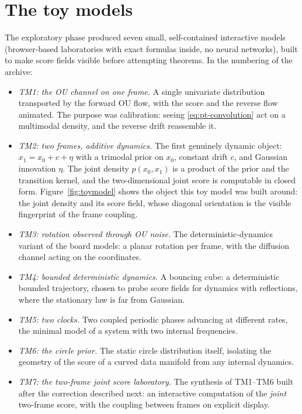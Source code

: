 \section{The toy models}\label{sec:dev-toys}

The exploratory phase produced seven small, self-contained interactive
models (browser-based laboratories with exact formulas inside, no neural
networks), built to make score fields visible before attempting theorems.
In the numbering of the archive:

\begin{itemize}
  \item \emph{TM1: the OU channel on one frame.} A single univariate
  distribution transported by the forward OU flow, with the score and the
  reverse flow animated. The purpose was calibration: seeing
  \eqref{eq:pt-convolution} act on a multimodal density, and the reverse
  drift reassemble it.
  \item \emph{TM2: two frames, additive dynamics.} The first genuinely
  dynamic object: $x_1 = x_0 + c + \eta$ with a trimodal prior on $x_0$,
  constant drift $c$, and Gaussian innovation $\eta$. The joint density
  $p(x_0, x_1)$ is a product of the prior and the transition kernel, and
  the two-dimensional joint score is computable in closed form.
  Figure~\ref{fig:toymodel} shows the object this toy model was built
  around: the joint density and its score field, whose diagonal
  orientation is the visible fingerprint of the frame coupling.
  \item \emph{TM3: rotation observed through OU noise.} The
  deterministic-dynamics variant of the board models: a planar rotation
  per frame, with the diffusion channel acting on the coordinates.
  \item \emph{TM4: bounded deterministic dynamics.} A bouncing cube:
  a deterministic bounded trajectory, chosen to probe score fields
  for dynamics with reflections, where the stationary law is far from
  Gaussian.
  \item \emph{TM5: two clocks.} Two coupled periodic phases advancing at
  different rates, the minimal model of a system with two internal
  frequencies.
  \item \emph{TM6: the circle prior.} The static circle distribution
  itself, isolating the geometry of the score of a curved data manifold
  from any internal dynamics.
  \item \emph{TM7: the two-frame joint score laboratory.} The synthesis
  of TM1--TM6 built after the correction described next: an interactive
  computation of the \emph{joint} two-frame score, with the coupling
  between frames on explicit display.
\end{itemize}


